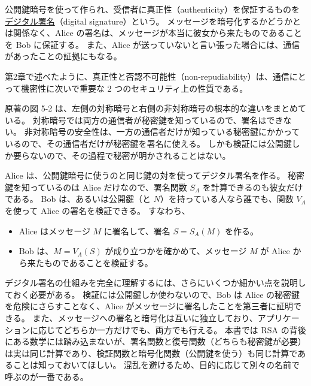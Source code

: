 \documentclass[uplatex]{jsarticle}
\def\label#1{}%
\begin{document}
\begin{dfn}[デジタル署名]\label{dfn:ch5-digital-signature}
公開鍵暗号を使って作られ、受信者に真正性（authenticity）を保証するものを\underline{デジタル署名}（digital signature）という。
メッセージを暗号化するかどうかとは関係なく、Alice の署名は、メッセージが本当に彼女から来たものであることを Bob に保証する。
また、Alice が送っていないと言い張った場合には、通信があったことの証拠にもなる。
\end{dfn}

第2章で述べたように、真正性と否認不可能性（non-repudiability）は、通信にとって機密性に次いで重要な 2 つのセキュリティ上の性質である。

原著の図 5-2 は、左側の対称暗号と右側の非対称暗号の根本的な違いをまとめている。
対称暗号では両方の通信者が秘密鍵を知っているので、署名はできない。
非対称暗号の安全性は、一方の通信者だけが知っている秘密鍵にかかっているので、その通信者だけが秘密鍵を署名に使える。
しかも検証には公開鍵しか要らないので、その過程で秘密が明かされることはない。

\begin{exa}[デジタル署名の作成と検証]\label{exa:ch5-sign-verify}
Alice は、公開鍵暗号に使うのと同じ鍵の対を使ってデジタル署名を作る。
秘密鍵を知っているのは Alice だけなので、署名関数 $S_A$ を計算できるのも彼女だけである。
Bob は、あるいは公開鍵（と $N$）を持っている人なら誰でも、関数 $V_A$ を使って Alice の署名を検証できる。
すなわち、
\begin{itemize}
\item Alice はメッセージ $M$ に署名して、署名 $S = S_A(M)$ を作る。
\item Bob は、$M = V_A(S)$ が成り立つかを確かめて、メッセージ $M$ が Alice から来たものであることを検証する。
\end{itemize}
\end{exa}

デジタル署名の仕組みを完全に理解するには、さらにいくつか細かい点を説明しておく必要がある。
検証には公開鍵しか使わないので、Bob は Alice の秘密鍵を危険にさらすことなく、Alice がメッセージに署名したことを第三者に証明できる。
また、メッセージへの署名と暗号化は互いに独立しており、アプリケーションに応じてどちらか一方だけでも、両方でも行える。
本書では RSA の背後にある数学には踏み込まないが、署名関数と復号関数（どちらも秘密鍵が必要）は実は同じ計算であり、検証関数と暗号化関数（公開鍵を使う）も同じ計算であることは知っておいてほしい。
混乱を避けるため、目的に応じて別々の名前で呼ぶのが一番である。
\end{document}
